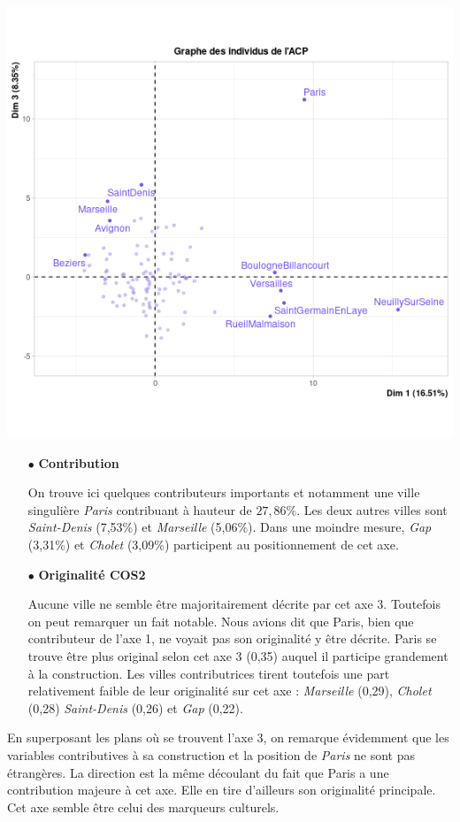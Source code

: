 \documentclass{article}
\begin{document}
\centerline{\includegraphics[width=0.8\linewidth]{images/ACP_ind_13_contrib}} 

\begin{itemize}
\item[$\bullet$] \textbf{Contribution}

On trouve ici quelques contributeurs importants et notamment une ville singulière \emph{Paris} contribuant à hauteur de $27,86\%$. Les deux autres villes sont \emph{Saint-Denis} (7,53\%) et \emph{Marseille} (5,06\%). Dans une moindre mesure, \emph{Gap} (3,31\%) et \emph{Cholet} (3,09\%) participent au positionnement de cet axe.

\item[$\bullet$] \textbf{Originalité COS2}

Aucune ville ne semble être majoritairement décrite par cet axe 3. Toutefois on peut remarquer un fait notable. Nous avions dit que Paris, bien que contributeur de l'axe 1, ne voyait pas son originalité y être décrite. Paris se trouve être plus original selon cet axe 3 (0,35) auquel il participe grandement à la construction. Les villes contributrices tirent toutefois une part relativement faible de leur originalité sur cet axe : \emph{Marseille} (0,29),  \emph{Cholet} (0,28) \emph{Saint-Denis} (0,26) et \emph{Gap} (0,22).
\end{itemize}

En superposant les plans où se trouvent l'axe 3, on remarque évidemment que les variables contributives à sa construction et la position de \emph{Paris} ne sont pas étrangères. La direction est la même découlant du fait que Paris a une contribution majeure à cet axe. Elle en tire d'ailleurs son originalité principale. Cet axe semble être celui des marqueurs culturels. 
\end{document}
